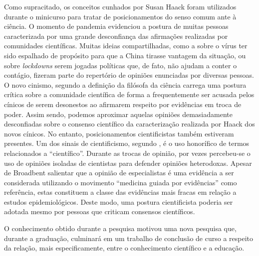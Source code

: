 \documentclass[12pt]{report}
\begin{document}
	Como supracitado, os conceitos cunhados por Susan Haack foram utilizados durante o minicurso para tratar de posicionamentos do senso comum ante à ciência.
	O momento de pandemia evidenciou a postura de muitas pessoas caracterizada por uma grande desconfiança das afirmações realizadas por comunidades científicas.
	Muitas ideias compartilhadas, como a sobre o vírus ter sido espalhado de propósito para que a China tirasse vantagem da situação, ou sobre \textit{lockdowns} serem jogadas políticas que, de fato, não ajudam a conter o contágio, fizeram parte do repertório de opiniões enunciadas por diversas pessoas.
	O novo cinismo, segundo a definição da filósofa da ciência carrega uma postura crítica sobre a comunidade científica de forma a frequentemente ser acusada pelos cínicos de serem desonestos ao afirmarem respeito por evidências em troca de poder.
	Assim sendo, podemos aproximar aquelas opiniões demasiadamente desconfiadas sobre o consenso científico da caracterização realizada por Haack dos novos cínicos.
	No entanto, posicionamentos cientificistas também estiveram presentes.
	Um dos sinais de cientificismo, segundo \textcite{haack-six-signs}, é o uso honorífico de termos relacionados a ``científico''.
	Durante as trocas de opinião, por vezes percebeu-se o uso de opiniões isoladas de cientistas para defender opiniões heterodoxas.
	Apesar de Broadbent salientar que a opinião de especialistas é uma evidência a ser considerada utilizando o movimento ``medicina guiada por evidências'' como referência, estas constituem a classe das evidências mais fracas em relação a estudos epidemiológicos.
	Deste modo, uma postura cientificista poderia ser adotada mesmo por pessoas que criticam consensos científicos.
	
	O conhecimento obtido durante a pesquisa motivou uma nova pesquisa que, durante a graduação, culminará em um trabalho de conclusão de curso a respeito da relação, mais especificamente, entre o conhecimento científico e a educação.
	
	\newpage
	\vspace*{-3cm}
	\printbibliography
	
\end{document}
